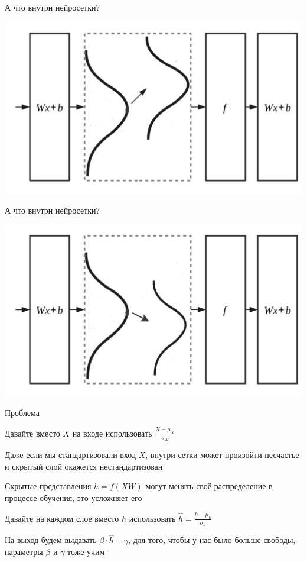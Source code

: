 \documentclass[notes,12pt, aspectratio=169]{beamer}
\newenvironment{wideitemize}{\itemize\addtolength{\itemsep}{10pt}}{\enditemize}
\begin{document}
\begin{frame}{А что внутри нейросетки?}
\begin{center}
\includegraphics[width=.7\linewidth]{distributions_1.png}
\end{center}
\end{frame}


\begin{frame}{А что внутри нейросетки?}
\begin{center}
	\includegraphics[width=.7\linewidth]{distributions_2.png}
\end{center}
\end{frame}


\begin{frame}{Проблема}
\begin{wideitemize}
	\item Давайте вместо $X$ на входе использовать $\frac{X - \mu_X}{\sigma_X}$
	
	\item  Даже если мы стандартизовали вход $X$, внутри сетки может произойти несчастье и скрытый слой окажется нестандартизован 
	
	\item  Скрытые представления $h = f(XW)$  могут менять своё распределение в процессе обучения, это усложняет его  \pause
	
	\item Давайте на каждом слое вместо $h$ использовать  $\hat h = \frac{h - \mu_h}{\sigma_h}$
	
	\item На выход будем выдавать $\beta \cdot  \hat h + \gamma$, для того, чтобы у нас было больше свободы, параметры $\beta$ и $\gamma$ тоже учим 
\end{wideitemize}
\end{frame}
\end{document}
